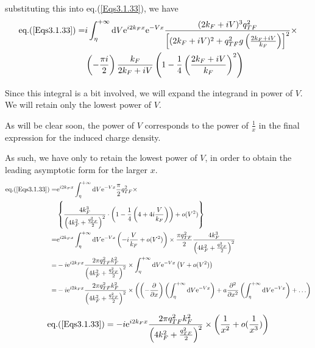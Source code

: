 \begin{itemize}
substituting this into eq.(\ref{Eqs3.1.33}), we have
\[\begin{split}
\text{eq.(\ref{Eqs3.1.33})} = &i \int_{\eta}^{+\infty} \mathrm{d} V \mathrm{e}^{i 2 k_F x} \mathrm{e}^{-V x} \frac{(2 k_F + i V)^3 q_{TF}^2}{\left[ (2 k_F + i V)^2 + q_{TF}^2 g\left( \frac{2 k_F +i V}{k_F}\right) \right]^2}\times\\
&\left(- \frac{\pi i}{2}\right) \frac{k_F}{2 k_F + i V} \left( 1- \frac{1}{4}\left( \frac{2 k_F +i V}{k_F} \right)^2 \right)
\end{split}\]

Since this integral is a bit involved, we will expand the integrand in power of $V$. We will retain only the lowest power of $V$.

As will be clear soon, the power of $V$ corresponds to the power of $\frac{1}{x}$ in the final expression for the induced charge density.

As such, we have only to retain the lowest power of $V$, in order to obtain the leading asymptotic form for the larger $x$.
\[\allowdisplaybreaks\begin{split}
\text{eq.(\ref{Eqs3.1.33})} = &\mathrm{e}^{i 2 k_F x} \int_{\eta}^{+\infty} \mathrm{d} V  \mathrm{e}^{-V x} \frac{\pi}{2}q_{TF}^2\times\\
&\left\{ \frac{4 k_F^3}{\left( 4 k_F^2 + \frac{q_{TF}^2}{2} \right)^2} \cdot \left( 1-\frac{1}{4}\left( 4 + 4 i \frac{V}{k_F} \right) \right) + o(V^2) \right\}\\
=&\mathrm{e}^{i 2 k_F x} \int_{\eta}^{+\infty} \mathrm{d} V  \mathrm{e}^{-V x} \left( -i \frac{V}{k_F} + o(V^2) \right) \times \frac{\pi q_{TF}^2}{2} \frac{4 k_F^3}{\left( 4 k_F^2 + \frac{q_{TF}^2}{2} \right)^2}\\
=&-i \mathrm{e}^{i 2 k_F x} \frac{2\pi q_{TF}^2 k_F^2}{\left( 4 k_F^2 + \frac{q_{TF}^2}{2} \right)^2} \times \int_{\eta}^{+\infty} \mathrm{d} V  \mathrm{e}^{-V x} \left( V + o(V^2) \right)\\
=&-i \mathrm{e}^{i 2 k_F x} \frac{2\pi q_{TF}^2 k_F^2}{\left( 4 k_F^2 + \frac{q_{TF}^2}{2} \right)^2} \times \left( \left( -\frac{\partial}{\partial x} \right) \left( \int_{\eta}^{+\infty} \mathrm{d} V  \mathrm{e}^{-V x} \right) + a \frac{\partial^2}{\partial x^2} \left( \int_{\eta}^{+\infty} \mathrm{d} V  \mathrm{e}^{-V x} \right) + \ldots \right)
\end{split}\]

\begin{equation} \label{Eqs3.1.34}
\text{eq.(\ref{Eqs3.1.33})} = -i \mathrm{e}^{i 2 k_F x} \frac{2\pi q_{TF}^2 k_F^2}{\left( 4 k_F^2 + \frac{q_{TF}^2}{2} \right)^2} \times \left( \frac{1}{x^2} + o(\frac{1}{x^3}) \right)
\end{equation}


\end{itemize}
